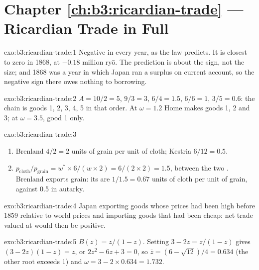 \section*{Chapter \ref{ch:b3:ricardian-trade} --- Ricardian Trade in Full}

\begin{solution}{exo:b3:ricardian-trade:1}
Negative in every year, as the law predicts. %
It is closest to zero in 1868, at $-0.18$ million ryō. The prediction is about
the sign, not the size; and 1868 was a year in which Japan ran a surplus on
current account, so the negative sign there owes nothing to borrowing.
\end{solution}

\begin{solution}{exo:b3:ricardian-trade:2}
$A = 10/2 = 5$, $9/3 = 3$, $6/4 = 1.5$, $6/6 = 1$, $3/5 = 0.6$: the chain is goods 1, 2,
3, 4, 5 in that order. At $\omega = 1.2$ Home makes goods 1, 2 and 3; at $\omega = 3.5$,
good 1 only.
\end{solution}

\begin{solution}{exo:b3:ricardian-trade:3}
\begin{enumerate}
\item Brenland $4/2 = 2$ units of grain per unit of cloth; Kestria $6/12 = 0.5$.
\item $p_{\text{cloth}}/p_{\text{grain}} = w^* \times 6/(w \times 2) = 6/(2 \times 2) =
1.5$, between the two . Brenland exports grain: its 
are $1/1.5 = 0.67$ units of cloth per unit of grain, against 0.5 in autarky.
\end{enumerate}
\end{solution}

\begin{solution}{exo:b3:ricardian-trade:4}
Japan exporting goods whose prices had been high before 1859 relative to world
prices and importing goods that had been cheap: net trade valued at  would then be positive.
\end{solution}

\begin{solution}{exo:b3:ricardian-trade:5}
$B(z) = z/(1 - z)$. Setting $3 - 2z = z/(1 - z)$ gives $(3 - 2z)(1 - z) = z$, or $2z^2 - 6z
+ 3 = 0$, so $\bar z = (6 - \sqrt{12})/4 = 0.634$ (the other root exceeds 1) and $\omega = 3
- 2 \times 0.634 = 1.732$.
\end{solution}

